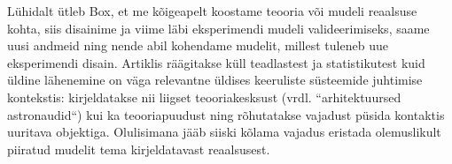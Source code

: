 \documentclass{tufte-book}
\begin{document}
Lühidalt ütleb Box, et me kõigeapelt koostame teooria või mudeli reaalsuse kohta, siis disainime ja viime läbi eksperimendi mudeli valideerimiseks, saame uusi andmeid ning nende abil kohendame mudelit, millest tuleneb uue eksperimendi disain. Artiklis räägitakse küll teadlastest ja statistikutest kuid üldine lähenemine on  väga relevantne üldises keeruliste süsteemide juhtimise kontekstis: kirjeldatakse nii liigset teooriakesksust (vrdl. ``arhitektuursed astronaudid``) kui ka teooriapuudust ning rõhutatakse vajadust püsida kontaktis uuritava objektiga. Olulisimana jääb siiski kõlama vajadus eristada olemuslikult piiratud mudelit tema kirjeldatavast reaalsusest.  







\backmatter
\nocite{*}

 

\printindex
\end{document}

